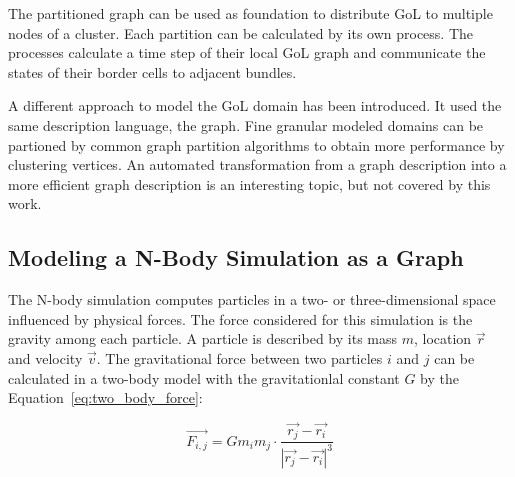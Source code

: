 \noindent The partitioned graph can be used as foundation to distribute GoL to
multiple nodes of a cluster. Each partition can be calculated by its own
process. The processes calculate a time step of their local GoL graph and
communicate the states of their border cells to adjacent bundles.

A different approach to model the GoL domain has been introduced.  It
used the same description language, the graph.  Fine granular modeled
domains can be partioned by common graph partition algorithms to
obtain more performance by clustering vertices. An automated
transformation from a graph description into a more efficient graph
description is an interesting topic, but not covered by this work.


\subsection{Modeling a N-Body Simulation as a Graph}
\label{sec:design:nbody}


The N-body simulation computes particles in a two- or
three-dimensional space influenced by physical forces. The force
considered for this simulation is the gravity among each particle.  A
particle is described by its mass $m$, location $\overrightarrow{r}$
and velocity $\overrightarrow{v}$.  The gravitational force between
two particles $i$ and $j$ can be calculated in a two-body model with
the gravitationlal constant $G$ by the
Equation~\ref{eq:two_body_force}:

\begin{equation}
  \label{eq:two_body_force}
  \overrightarrow{F_{i,j}} = G  m_i  m_j \cdot \frac{\overrightarrow{r_j} - \overrightarrow{r_i}}{|\overrightarrow{r_j} - \overrightarrow{r_i}|^3}
\end{equation}

